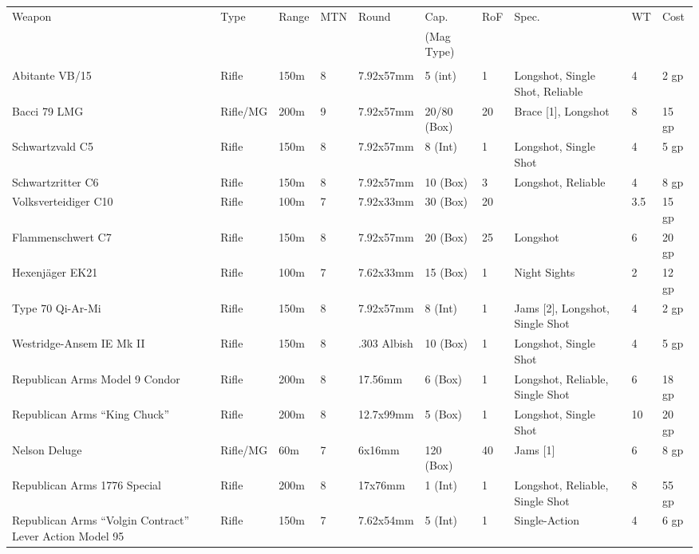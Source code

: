 \documentclass[a4paper, twocolumn, openany]{book}
\begin{document}
{{	{\centering
	\begin{tabular}{p{2.6cm}lllp{2cm}llp{2cm}ll}
	Weapon & Type & Range & MTN & Round & Cap. & RoF & Spec. & WT & Cost\\ 
	&&&&& (Mag Type) \\ \hline \\
	Abitante VB/15 											& Rifle 	& 150m 	& 8 & 7.92x57mm 	& 5 (int) 		& 1 	& Longshot, Single Shot, Reliable 						& 4 	& 2 gp 	\\
	Bacci 79 LMG 											& Rifle/MG 	& 200m 	& 9 & 7.92x57mm 	& 20/80 (Box) 	& 20 	& Brace [1], Longshot 									& 8 	& 15 gp \\
	Schwartzvald C5 										& Rifle 	& 150m 	& 8 & 7.92x57mm 	& 8 (Int) 		& 1 	& Longshot, Single Shot 								& 4 	& 5 gp 	\\
	Schwartzritter C6 										& Rifle 	& 150m 	& 8 & 7.92x57mm 	& 10 (Box) 		& 3 	& Longshot, Reliable 									& 4 	& 8 gp 	\\
	Volksverteidiger C10 									& Rifle 	& 100m 	& 7 & 7.92x33mm 	& 30 (Box) 		& 20 	&  														& 3.5 	& 15 gp \\
	Flammenschwert C7 										& Rifle 	& 150m 	& 8 & 7.92x57mm 	& 20 (Box) 		& 25 	& Longshot 												& 6 	& 20 gp \\
	Hexenjäger EK21 										& Rifle 	& 100m 	& 7 & 7.62x33mm 	& 15 (Box) 		& 1 	& Night Sights 											& 2 	& 12 gp \\
	Type 70 Qi-Ar-Mi 										& Rifle 	& 150m 	& 8 & 7.92x57mm 	& 8 (Int) 		& 1 	& Jams [2], Longshot, Single Shot 						& 4 	& 2 gp 	\\
	Westridge-Ansem IE Mk II 								& Rifle 	& 150m 	& 8 & .303 Albish 	& 10 (Box) 		& 1 	& Longshot, Single Shot 								& 4 	& 5 gp 	\\
	Republican Arms Model 9 Condor 							& Rifle 	& 200m 	& 8 & 17.56mm 		& 6 (Box) 		& 1 	& Longshot, Reliable, Single Shot 						& 6 	& 18 gp \\
	Republican Arms “King Chuck” 							& Rifle 	& 200m 	& 8 & 12.7x99mm 	& 5 (Box) 		& 1 	& Longshot, Single Shot 								& 10 	& 20 gp \\
	Nelson Deluge 											& Rifle/MG 	& 60m 	& 7 & 6x16mm 		& 120 (Box) 	& 40 	& Jams [1] 												& 6 	& 8 gp 	\\
	Republican Arms 1776 Special 							& Rifle 	& 200m 	& 8 & 17x76mm 		& 1 (Int) 		& 1 	& Longshot, Reliable, Single Shot 						& 8 	& 55 gp \\
	Republican Arms “Volgin Contract” Lever Action Model 95 & Rifle 	& 150m 	& 7 & 7.62x54mm 	& 5 (Int) 		& 1 	& Single-Action 										& 4 	& 6 gp 	\\

\end{tabular}}}}
\end{document}
